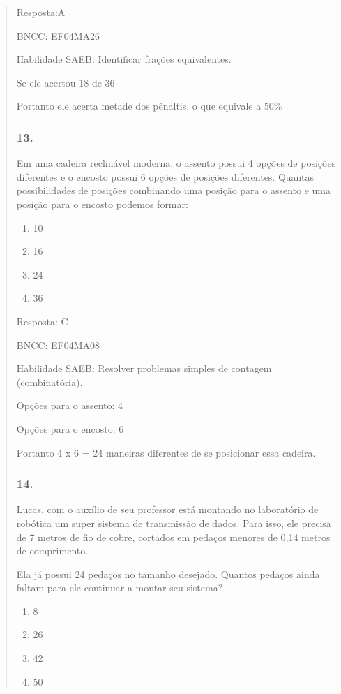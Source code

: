 \begin{enumerate}
\begin{escolha}
\begin{enumerate}
\begin{itemize}
\begin{itemize}
\begin{escolha}
\begin{quote}
\begin{escolha}
{Resposta:A

BNCC: EF04MA26

Habilidade SAEB: Identificar frações equivalentes.

Se ele acertou 18 de 36

Portanto ele acerta metade dos pênaltis, o que equivale a 50\%

\subsubsection{13.}\label{section-184}

Em uma cadeira reclinável moderna, o assento possui 4 opções de posições
diferentes e o encosto possui 6 opções de posições diferentes. Quantas
possibilidades de posições combinando uma posição para o assento e uma
posição para o encosto podemos formar:

\begin{enumerate}
\def\labelenumi{\alph{enumi})}
\item
  10
\item
  16
\item
  24
\item
  36
\end{enumerate}

Resposta: C

BNCC: EF04MA08

Habilidade SAEB: Resolver problemas simples de contagem (combinatória).

Opções para o assento: 4

Opções para o encosto: 6

Portanto 4 x 6 = 24 maneiras diferentes de se posicionar essa cadeira.

\subsubsection{14.}\label{section-185}

Lucas, com o auxílio de seu professor está montando no laboratório de
robótica um super sistema de transmissão de dados. Para isso, ele
precisa de 7 metros de fio de cobre, cortados em pedaços menores de 0,14
metros de comprimento.

Ela já possui 24 pedaços no tamanho desejado. Quantos pedaços ainda
faltam para ele continuar a montar seu sistema?

\begin{enumerate}
\def\labelenumi{\alph{enumi})}
\item
  8
\item
  26
\item
  42
\item
  50
\end{enumerate}

}
\end{escolha}
\end{quote}
\end{escolha}
\end{itemize}
\end{itemize}
\end{enumerate}
\end{escolha}
\end{enumerate}
